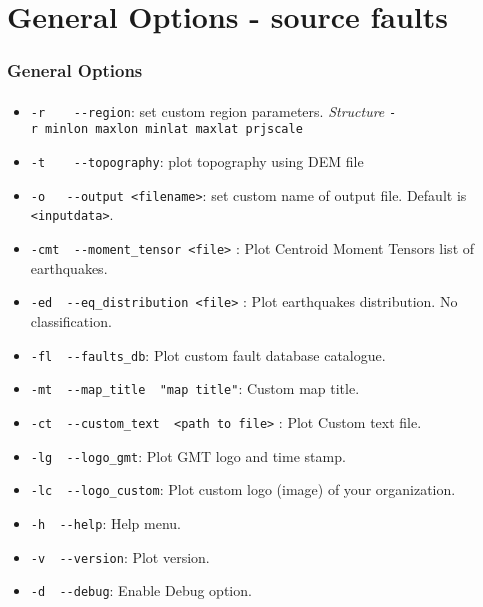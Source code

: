 \section[General arg]{General Options - source faults}

\graphicspath{{Chapter4/Figs/Vector/}{Figs/}}
\begin{frame}
  \frametitle{General Options}
  \framesubtitle{}
  \label{fr4:hist_pics}
\begin{scriptsize}
\begin{itemize}
\item
  \texttt{-r\ \ \ \textbar{}\ -\/-region}: set custom region parameters.
  \emph{Structure} \texttt{-r\ minlon\ maxlon\ minlat\ maxlat\ prjscale}
\item
  \texttt{-t\ \ \ \textbar{}\ -\/-topography}: plot topography using DEM
  file
\item
  \texttt{-o\ \ \textbar{}\ -\/-output\ \textless{}filename\textgreater{}}:
  set custom name of output file. Default is
  \texttt{\textless{}inputdata\textgreater{}}.
\item
  \texttt{-cmt\ \textbar{}\ -\/-moment\_tensor\ \textless{}file\textgreater{}}
  : Plot Centroid Moment Tensors list of earthquakes.
\item
  \texttt{-ed\ \textbar{}\ -\/-eq\_distribution\ \textless{}file\textgreater{}}
  : Plot earthquakes distribution. No classification.
\item
  \texttt{-fl\ \textbar{}\ -\/-faults\_db}: Plot custom fault database
  catalogue.
\item
  \texttt{-mt\ \textbar{}\ -\/-map\_title\ \ "map\ title"}: Custom map
  title.
\item
  \texttt{-ct\ \textbar{}\ -\/-custom\_text\ \ \textless{}path\ to\ file\textgreater{}}
  : Plot Custom text file.
\item
  \texttt{-lg\ \textbar{}\ -\/-logo\_gmt}: Plot GMT logo and time stamp.
\item
  \texttt{-lc\ \textbar{}\ -\/-logo\_custom}: Plot custom logo (image)
  of your organization.
\item
  \texttt{-h\ \textbar{}\ -\/-help}: Help menu.
\item
  \texttt{-v\ \textbar{}\ -\/-version}: Plot version.
\item
  \texttt{-d\ \textbar{}\ -\/-debug}: Enable Debug option.
\end{itemize}
\end{scriptsize}
\end{frame}
\note{}

